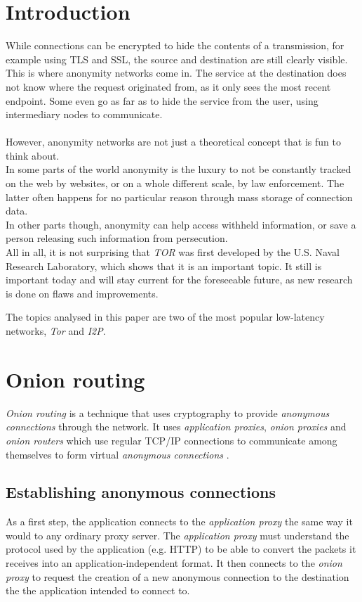 \documentclass{sig-alternate}
\begin{document}
\section{Introduction}
While connections can be encrypted to hide the contents of a transmission, for example using TLS and SSL, the source and destination are still clearly visible.
\\
This is where anonymity networks come in.
The service at the destination does not know where the request originated from, as it only sees the most recent endpoint.
Some even go as far as to hide the service from the user, using intermediary nodes to communicate.
\\
\\
However, anonymity networks are not just a theoretical concept that is fun to think about.
\\
In some parts of the world anonymity is the luxury to not be constantly tracked on the web by websites, or on a whole different scale, by law enforcement.
The latter often happens for no particular reason through mass storage of connection data.
\\
In other parts though, anonymity can help access withheld information, or save a person releasing such information from persecution.
\\
All in all, it is not surprising that \emph{TOR} was first developed by the U.S. Naval Research Laboratory, which shows that it is an important topic.
It still is important today and will stay current for the foreseeable future, as new research is done on flaws and improvements\cite{craven2010}.

The topics analysed in this paper are two of the most popular low-latency networks, \emph{Tor} and \emph{I2P}.

\section{Onion routing}
\emph{Onion routing} is a technique that uses cryptography to provide \emph{anonymous connections}
through the network. It uses \emph{application proxies}, \emph{onion proxies} and
\emph{onion routers} which use regular TCP/IP connections to communicate among themselves
to form virtual \emph{anonymous connections} \cite{reed1998}.

\subsection{Establishing anonymous connections}
As a first step, the application connects to the \emph{application proxy} the same way it would to
any ordinary proxy server. The \emph{application proxy} must understand the protocol used by the
application (e.g. HTTP) to be able to convert the packets it receives into an
application-independent format. It then connects to the \emph{onion proxy} to request the
creation of a new anonymous connection to the destination the the application intended to connect to.
\end{document}
